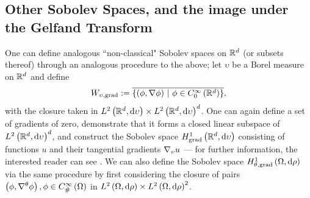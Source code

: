 
\subsection{Other Sobolev Spaces, and the image under the Gelfand Transform} \label{ssec:SobSpacesAndGelfand}
One can define analogous ``non-classical" Sobolev spaces on $\mathbb{R}^d$ (or subsets thereof) through an analogous procedure to the above; let $\upsilon$ be a Borel measure on $\mathbb{R}^d$ and define 
\begin{align*}
	W_{\upsilon,\mathrm{grad}} := \overline{ \left\{  \left( \phi, \nabla\phi \right) \ \middle\vert \  \phi\in C^{\infty}_{0}\left( \mathbb{R}^d \right)  \right\} },
\end{align*}
with the closure taken in $L^{2}\left( \mathbb{R}^d,\mathrm{d} \upsilon \right)\times L^{2}\left( \mathbb{R}^d,\mathrm{d} \upsilon \right)^d$.
One can again define a set of gradients of zero, demonstrate that it forms a closed linear subspace of $L^{2}\left( \mathbb{R}^d,\mathrm{d} \upsilon \right)^d$, and construct the Sobolev space $H^1_\mathrm{grad}\left( \mathbb{R}^d, \mathrm{d}\upsilon \right)$ consisting of functions $u$ and their tangential gradients $\nabla_{\upsilon}u$ --- for further information, the interested reader can see .
We can also define the Sobolev space $H^1_{\theta, \mathrm{grad}}\left( \Omega, \mathrm{d}\rho \right)$ via the same procedure by first considering the closure of pairs $\left( \phi, \nabla^{\theta}\phi \right), \phi\in C^{\infty}_{\#}\left( \Omega \right)$ in $L^{2}\left( \Omega,\mathrm{d} \rho \right)\times L^{2}\left( \Omega,\mathrm{d} \rho \right)^2$.

